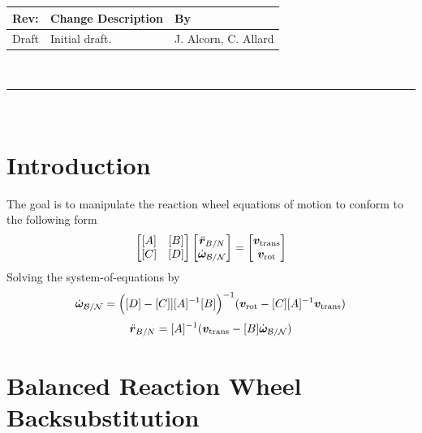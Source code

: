 \documentclass[]{BasiliskReportMemo}
\begin{document}
\makeCover


%
%
\pagestyle{empty}
{\renewcommand{\arraystretch}{1.1}
\noindent
\begin{longtable}{|p{0.5in}|p{4.0in}|p{1.64in}|}
\hline
{\bfseries Rev}: & {\bfseries Change Description} & {\bfseries By} \\
\hline
Draft & Initial draft. & J. Alcorn, C. Allard \\
\hline

\end{longtable}
}

\newpage
\setcounter{page}{1}
\pagestyle{fancy}

\tableofcontents
~\\ \hrule ~\\

\section{Introduction}
The goal is to manipulate the reaction wheel equations of motion to conform to the following form
\begin{equation}
\begin{bmatrix}
[A] & [B]\\
[C] & [D]
\end{bmatrix} \begin{bmatrix}
\ddot{\bm r}_{B/N}\\
\dot{\bm\omega}_{\cal B/N}
\end{bmatrix} = \begin{bmatrix}
\bm v_{\text{trans}}\\
\bm v_{\text{rot}}
\end{bmatrix}
\end{equation}
Solving the system-of-equations by
\begin{equation}
\dot{\bm\omega}_{\cal B/N} = \Big([D] - [C]][A]^{-1}[B]\Big)^{-1}(\bm v_{\text{rot}} - [C][A]^{-1}\bm v_{\text{trans}})
\end{equation}
\begin{equation}
\ddot{\bm r}_{B/N} = [A]^{-1} (\bm v_{\text{trans}} - [B]\dot{\bm\omega}_{\cal B/N})
\end{equation}


\section{Balanced Reaction Wheel Backsubstitution}
\end{document}
